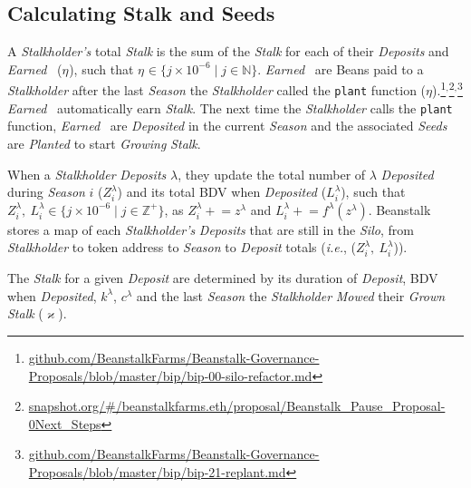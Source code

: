 \documentclass[tikz]{article}
\newcommand{\code}[1]{\texttt{#1}}
\newcommand{\term}[1]{\textsl{#1}}
\newcommand{\Bean}{} %
\newcommand{\bean}{} %
\begin{document}
\subsection{Calculating Stalk and Seeds}
A \term{Stalkholder's} total \term{Stalk} is the sum of the \term{Stalk} for each of their \term{Deposits} and \term{Earned} \Bean\ ($\eta^{\bean}$), such that $\eta^{\bean} \in \{j \times 10^{-6} \mid j \in \mathbb{N} \}$. 
\term{Earned} \Bean\ are Beans paid to a \term{Stalkholder} after the last \term{Season} the \term{Stalkholder} called the \code{plant} function ($\eta$).\footnote{\href{https://github.com/BeanstalkFarms/Beanstalk-Governance-Proposals/blob/master/bip/bip-00-silo-refactor.md}{github.com/BeanstalkFarms/Beanstalk-Governance-Proposals/blob/master/bip/bip-00-silo-refactor.md}}$^{,}$\footnote{\href{https://snapshot.org/\#/beanstalkfarms.eth/proposal/0xffc6033eb5a4e53f4da5df1c4011bacc12244914885fe11e6a6f2d09d856feed}{snapshot.org/\#/beanstalkfarms.eth/proposal/Beanstalk\_Pause\_Proposal-0\:Next\_Steps}}$^{,}$\footnote{\href{https://github.com/BeanstalkFarms/Beanstalk-Governance-Proposals/blob/master/bip/bip-21-replant.md}{github.com/BeanstalkFarms/Beanstalk-Governance-Proposals/blob/master/bip/bip-21-replant.md}} \term{Earned} \Bean\ automatically earn \term{Stalk}. The next time the \term{Stalkholder} calls the \code{plant} function, \term{Earned} \Bean\ are \term{Deposited} in the current \term{Season} and the associated \term{Seeds} are \term{Planted} to start \term{Growing} \term{Stalk}.

When a \term{Stalkholder} \term{Deposits} $\lambda$, they update the total number of $\lambda$ \term{Deposited} during \term{Season} $i$ ($Z_i^{\lambda}$) and its total BDV when \term{Deposited} ($L_i^{\lambda}$), such that $Z_i^{\lambda},\ L_i^{\lambda} \in \{j \times 10^{-6} \mid j \in \mathbb{Z}^{+} \}$, as $Z_i^{\lambda} \mathrel{+}= z^{\lambda}$ and $L_i^{\lambda} \mathrel{+}= f^{\lambda}(z^{\lambda})$. Beanstalk stores a map of each \term{Stalkholder's} \term{Deposits} that are still in the \term{Silo}, from \term{Stalkholder} to token address to \term{Season} to \term{Deposit} totals (\term{i.e.}, ($Z_i^{\lambda},\ L_i^{\lambda}$)).

The \term{Stalk} for a given \term{Deposit} are determined by its duration of \term{Deposit}, BDV when \term{Deposited}, $k^{\lambda}$, $c^{\lambda}$ and the last \term{Season} the \term{Stalkholder} \term{Mowed} their \term{Grown} \term{Stalk} ($\varkappa$).
\end{document}
